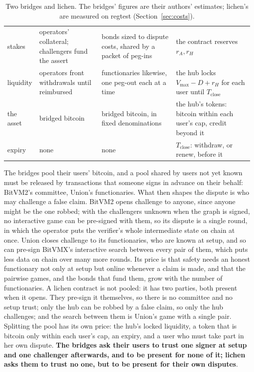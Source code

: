 \documentclass[11pt]{article}
\newcommand{\vmax}{V_{\max}}
\newcommand{\Tc}{T_{\mathrm{close}}}
\begin{document}
\begin{table}[!tp]
\begin{tabularx}{\linewidth}{>{\raggedright\arraybackslash}p{21mm}LLL}
stakes & operators' collateral; challengers fund the assert & bonds sized to dispute costs, shared by a packet of peg-ins & the contract reserves $r_A, r_H$ \\
liquidity & operators front withdrawals until reimbursed & functionaries likewise, one peg-out each at a time & the hub locks $\vmax - D + r_H$ for each user until $\Tc$ \\
the asset & bridged bitcoin & bridged bitcoin, in fixed denominations & the hub's tokens: bitcoin within each user's cap, credit beyond it \\
expiry & none & none & $\Tc$: withdraw, or renew, before it \\
\bottomrule
\end{tabularx}
\caption{Two bridges and lichen. The bridges' figures are their
authors' estimates; lichen's are measured on regtest
(Section~\ref{sec:costs}).}
\label{tab:bitvm2}
\end{table}

The bridges pool their users' bitcoin, and a pool shared by users not
yet known must be released by transactions that someone signs in
advance on their behalf: BitVM2's committee, Union's functionaries.
What then shapes the dispute is who may challenge a false claim. BitVM2
opens challenge to anyone, since anyone might be the one robbed; with
the challengers unknown when the graph is signed, no interactive game
can be pre-signed with them, so its dispute is a single round, in which
the operator puts the verifier's whole intermediate state on chain at
once. Union closes challenge to its functionaries, who are known at
setup, and so can pre-sign BitVMX's interactive search between every
pair of them, which puts less data on chain over many more rounds. Its
price is that safety needs an honest functionary not only at setup but
online whenever a claim is made, and that the pairwise games, and the
bonds that fund them, grow with the number of functionaries. A lichen
contract is not pooled: it has two parties, both present when it opens.
They pre-sign it themselves, so there is no committee and no setup
trust; only the hub can be robbed by a false claim, so only the hub
challenges; and the search between them is Union's game with a single
pair. Splitting the pool has its own price: the hub's locked liquidity,
a token that is bitcoin only within each user's cap, an expiry, and a
user who must take part in her own dispute. \textbf{The bridges ask their users
to trust one signer at setup and one challenger afterwards, and to be
present for none of it; lichen asks them to trust no one, but to be
present for their own disputes}.
\end{document}
